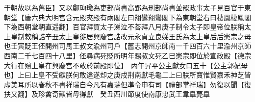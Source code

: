 于朝故以為舊臣】又以鄭珣瑜為吏部尚書高郢為刑部尚書並罷政事太子見百官于東朝堂【唐六典大明宫含元殿夾殿有兩閣左曰翔鸞翔鸞閣下為東朝堂右曰棲鳳棲鳳閣下為西朝堂朝直遥翻】百官拜賀太子涕泣不荅拜八月庚子制令太子即皇帝位朕稱太上皇制敕稱誥辛丑太上皇徙居興慶宫誥改元永貞立良娣王氏為太上皇后后憲宗之母也壬寅貶王伾開州司馬王叔文渝州司戶【舊志開州京師南一千四百六十里渝州京師西南二千七百四十八里】伾尋病死貶所明年賜叔文死乙巳憲宗即位於宣政殿【德宗大行在殯上皇在興慶宫不敢於前殿即位】　丙午昇平公主獻女口五十【公主郭妃母也】上曰上皇不受獻朕何敢違遂却之庚戍荆南獻毛龜二上曰朕所寶惟賢嘉禾神芝皆虛美耳所以春秋不書祥瑞自今凡有嘉瑞但凖令申有司【禮部掌祥瑞】勿復以聞【復扶又翻】及珍禽奇獸皆毋得獻　癸丑西川節度使南康忠武王韋臯薨臯